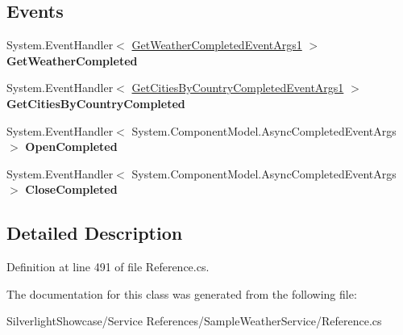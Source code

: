\subsection*{Events}
\begin{DoxyCompactItemize}
\item 
\hypertarget{class_silverlight_showcase_1_1_sample_weather_service_1_1_global_weather_http_get_client_a244ff6f18261a39553b38e257a7502d1}{
System.EventHandler$<$ \hyperlink{class_silverlight_showcase_1_1_sample_weather_service_1_1_get_weather_completed_event_args1}{GetWeatherCompletedEventArgs1} $>$ {\bfseries GetWeatherCompleted}}
\label{class_silverlight_showcase_1_1_sample_weather_service_1_1_global_weather_http_get_client_a244ff6f18261a39553b38e257a7502d1}

\item 
\hypertarget{class_silverlight_showcase_1_1_sample_weather_service_1_1_global_weather_http_get_client_a51908aec35a70f19ab8ec1df5dc1715e}{
System.EventHandler$<$ \hyperlink{class_silverlight_showcase_1_1_sample_weather_service_1_1_get_cities_by_country_completed_event_args1}{GetCitiesByCountryCompletedEventArgs1} $>$ {\bfseries GetCitiesByCountryCompleted}}
\label{class_silverlight_showcase_1_1_sample_weather_service_1_1_global_weather_http_get_client_a51908aec35a70f19ab8ec1df5dc1715e}

\item 
\hypertarget{class_silverlight_showcase_1_1_sample_weather_service_1_1_global_weather_http_get_client_a54614d41f86fa3eb4bf036109bc9efb6}{
System.EventHandler$<$ System.ComponentModel.AsyncCompletedEventArgs $>$ {\bfseries OpenCompleted}}
\label{class_silverlight_showcase_1_1_sample_weather_service_1_1_global_weather_http_get_client_a54614d41f86fa3eb4bf036109bc9efb6}

\item 
\hypertarget{class_silverlight_showcase_1_1_sample_weather_service_1_1_global_weather_http_get_client_a4a8cf521706c03c42ea5c6b7d17e993a}{
System.EventHandler$<$ System.ComponentModel.AsyncCompletedEventArgs $>$ {\bfseries CloseCompleted}}
\label{class_silverlight_showcase_1_1_sample_weather_service_1_1_global_weather_http_get_client_a4a8cf521706c03c42ea5c6b7d17e993a}

\end{DoxyCompactItemize}


\subsection{Detailed Description}


Definition at line 491 of file Reference.cs.

The documentation for this class was generated from the following file:\begin{DoxyCompactItemize}
\item 
SilverlightShowcase/Service References/SampleWeatherService/Reference.cs\end{DoxyCompactItemize}
